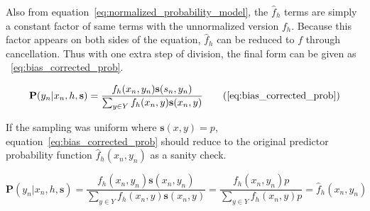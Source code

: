 \documentclass[twoside]{article}
\begin{document}
\begin{appendices}
Also from equation~\eqref{eq:normalized_probability_model}, the \(\hat{f}_h\) terms are simply a constant factor of same terms with the unnormalized version \(f_h\). Because this factor appears on both sides of the equation, \(\hat{f}_h\) can be reduced to \(f\) through cancellation. Thus with one extra step of division, the final form can be given as ~\eqref{eq:bias_corrected_prob}.

\begin{equation}
\mathbf{P}(y_n|x_n,h,\mathbf{s})=\dfrac{f_h(x_n,y_n)\mathbf{s}(s_n,y_n)}{\sum_{y \in Y}f_h(x_n,y)\mathbf{s}(x_n,y)}
\tag{\ref{eq:bias_corrected_prob}}
\end{equation}

If the sampling was uniform where \(\mathbf{s}(x,y)=p\), equation~\eqref{eq:bias_corrected_prob} should reduce to the original predictor probability function \(\hat{f}_h(x_n,y_n)\) as a sanity check.

\[\mathbf{P}(y_n|x_n,h,\mathbf{s})=\frac{f_h(x_n,y_n)\mathbf{s}(x_n,y_n)}{\sum_{y \in Y}f_h(x_n,y)\mathbf{s}(x_n,y)}=\frac{f_h(x_n,y_n)p}{\sum_{y \in Y}f_h(x_n,y)p} =\hat{f}_h(x_n,y_n)\]

\end{appendices}

\end{document}
